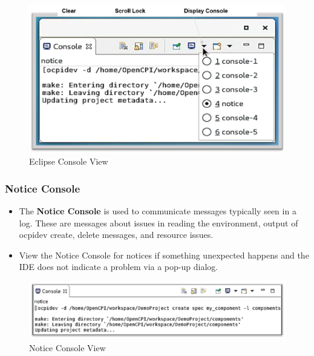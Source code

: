 \documentclass[10pt, a4paper, oneside]{article}
\begin{document}
 \begin{figure}[h!]
    \centering
   	 \includegraphics[width=.95\textwidth]{EclipseConsoleView.png}
     \caption{Eclipse Console View}
\end{figure}

\subsubsection{Notice Console}
\begin{itemize}
\item [] The \textbf{Notice Console} is used to communicate messages typically seen in a log. These are messages about issues in reading the environment, output of ocpidev create, delete messages, and resource issues.
\item [] View the Notice Console for notices if something unexpected happens and the IDE does not indicate a problem via a pop-up dialog.
\end{itemize}
\begin{figure}[h!]
    \centering
   	 \caption{Notice Console View}
   		 \includegraphics[width=\textwidth]{Noticeconsole.png}
\end{figure}
\end{document}
